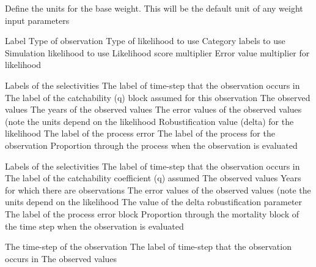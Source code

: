  {}
 {Define the units for the base weight. This will be the default unit of any weight input parameters}
\par\par
{} {Label}
 {Type of observation}
 {Type of likelihood to use}
 {Category labels to use}
 {Simulation likelihood to use}
 {Likelihood score multiplier}
 {Error value multiplier for likelihood}
\par\textbf{}\par
{} {Labels of the selectivities}
 {The label of time-step that the observation occurs in}
 {The label of the catchability (q) block assumed for this observation}
 {The observed values}
 {The years of the observed values}
 {The error values of the observed values (note the units depend on the likelihood}
 {Robustification value (delta) for the likelihood}
 {The label of the process error}
 {The label of the process for the observation}
 {Proportion through the process when the observation is evaluated}
\par\textbf{}\par
{} {Labels of the selectivities}
 {The label of time-step that the observation occurs in}
 {The label of the catchability coefficient (q) assumed}
 {The observed values}
 {Years for which there are observations}
 {The error values of the observed values (note the units depend on the likelihood}
 {The value of the delta robustification parameter}
 {The label of the process error block}
 {Proportion through the mortality block of the time step when the observation is evaluated}
\par\textbf{}\par
{} {The time-step of the observation}
 {The label of time-step that the observation occurs in}
 {The observed values}
